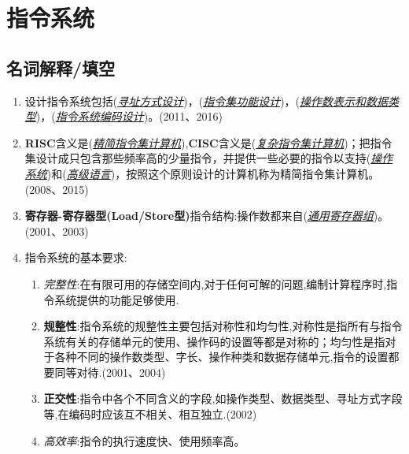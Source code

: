 \documentclass[a4paper]{ctexbook}
\newcommand{\blank}[1]{(\emph{\underline{#1}})}
\begin{document}
\newpage
\chapter{指令系统}
\section{名词解释/填空}
\begin{enumerate}
  \item 设计指令系统包括\blank{寻址方式设计}，\blank{指令集功能设计}，\blank{操作数表示和数据类型}，\blank{指令系统编码设计}。(2011、2016)
  \item \textbf{RISC}含义是\blank{精简指令集计算机},\textbf{CISC}含义是\blank{复杂指令集计算机}；把指令集设计成只包含那些频率高的少量指令，并提供一些必要的指令以支持\blank{操作系统}和\blank{高级语言}，按照这个原则设计的计算机称为精简指令集计算机。(2008、2015)
  \item \textbf{寄存器-寄存器型(Load/Store型)}指令结构:操作数都来自\blank{通用寄存器组}。(2001、2003)
  \item 指令系统的基本要求:
  \begin{enumerate}
    \item \emph{完整性}:在有限可用的存储空间内,对于任何可解的问题,编制计算程序时,指令系统提供的功能足够使用.
    \item \textbf{规整性}:指令系统的规整性主要包括对称性和均匀性,对称性是指所有与指令系统有关的存储单元的使用、操作码的设置等都是对称的；均匀性是指对于各种不同的操作数类型、字长、操作种类和数据存储单元,指令的设置都要同等对待.(2001、2004)
    \item \textbf{正交性}:指令中各个不同含义的字段,如操作类型、数据类型、寻址方式字段等,在编码时应该互不相关、相互独立.(2002)
    \item \emph{高效率}:指令的执行速度快、使用频率高。
  \end{enumerate}
\end{enumerate}
\end{document}
